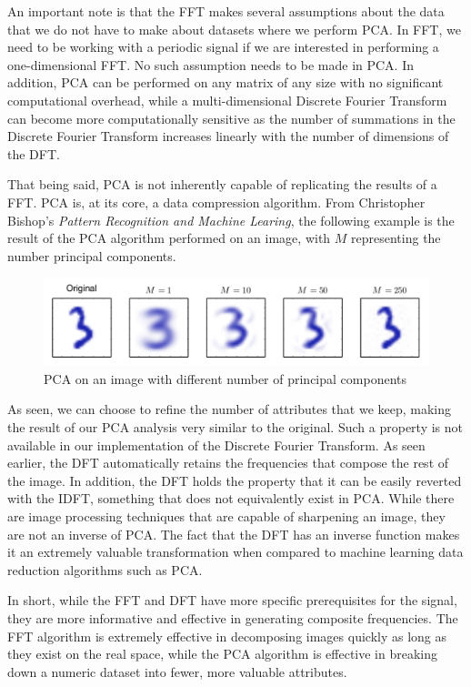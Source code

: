 \documentclass{amsproc}
\begin{document}
An important note is that the FFT makes several assumptions about the data that we do not have to make about datasets where we perform PCA. In FFT, we need to be working with a periodic signal if we are interested in performing a one-dimensional FFT. No such assumption needs to be made in PCA. In addition, PCA can be performed on any matrix of any size with no significant computational overhead, while a multi-dimensional Discrete Fourier Transform can become more computationally sensitive as the number of summations in the Discrete Fourier Transform increases linearly with the number of dimensions of the DFT.

That being said, PCA is not inherently capable of replicating the results of a FFT. PCA is, at its core, a data compression algorithm.  From Christopher Bishop's \textit{Pattern Recognition and Machine Learing}, the following example is the result of the PCA algorithm performed on an image, with $M$ representing the number principal components.

\begin{figure}[h]
	\includegraphics[scale=.6]{images/pca.png}
	\caption{PCA on an image with different number of principal components}
	\label{fig:pca}
\end{figure}

As seen, we can choose to refine the number of attributes that we keep, making the result of our PCA analysis very similar to the original. Such a property is not available in our implementation of the Discrete Fourier Transform. As seen earlier, the DFT automatically retains the frequencies that compose the rest of the image. In addition, the DFT holds the property that it can be easily reverted with the IDFT, something that does not equivalently exist in PCA. While there are image processing techniques that are capable of sharpening an image, they are not an inverse of PCA. The fact that the DFT has an inverse function makes it an extremely valuable transformation when compared to machine learning data reduction algorithms such as PCA.

In short, while the FFT and DFT have more specific prerequisites for the signal, they are more informative and effective in generating composite frequencies. The FFT algorithm is extremely effective in decomposing images quickly as long as they exist on the real space, while the PCA algorithm is effective in breaking down a numeric dataset into fewer, more valuable attributes.
\end{document}
